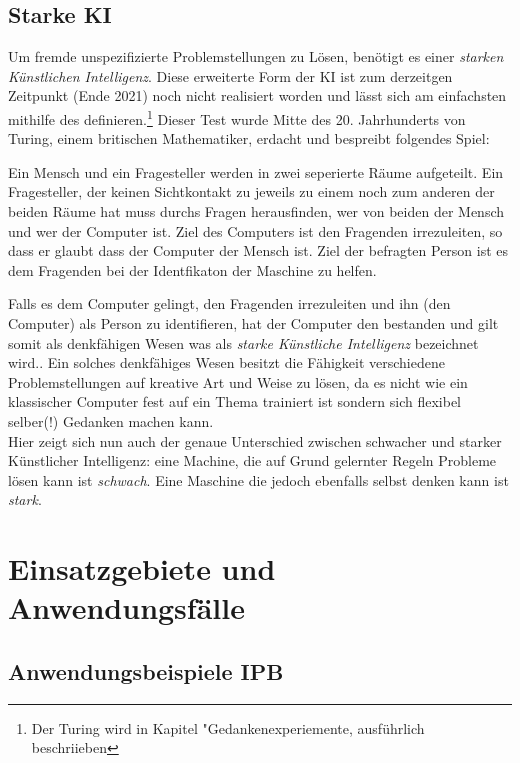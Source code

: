 \documentclass[12pt,german,ngerman]{report}
\begin{document}
    \section{Starke KI}
    Um fremde unspezifizierte Problemstellungen zu Lösen, benötigt es einer \emph{starken Künstlichen Intelligenz}.
    Diese erweiterte Form der KI ist zum derzeitgen Zeitpunkt (Ende 2021) noch nicht realisiert worden und lässt sich am
    einfachsten mithilfe des  definieren.\footnote{Der Turing wird in Kapitel "Gedankenexperiemente, ausführlich beschriieben}
    Dieser Test wurde Mitte des 20. Jahrhunderts von Turing, einem britischen Mathematiker, erdacht und bespreibt folgendes Spiel:
    \begin{displayquote}
        Ein Mensch und ein Fragesteller werden in zwei seperierte
        Räume aufgeteilt. Ein Fragesteller, der keinen Sichtkontakt zu jeweils zu einem noch zum anderen der beiden Räume hat
        muss durchs Fragen herausfinden, wer von beiden der Mensch und wer der Computer ist.
        Ziel des Computers ist den Fragenden irrezuleiten, so dass er glaubt dass der Computer der Mensch ist.
        Ziel der befragten Person ist es dem Fragenden bei der Identfikaton der Maschine zu helfen.\autocite{turing1950computing}
    \end{displayquote}
    Falls es dem Computer gelingt, den Fragenden irrezuleiten und ihn (den Computer) als Person zu identifieren, hat der Computer
    den  bestanden und gilt somit als denkfähigen Wesen was als \emph{starke Künstliche Intelligenz}
    bezeichnet wird.\autocite{oppy&dowe2020turingtest}. Ein solches denkfähiges Wesen besitzt die Fähigkeit verschiedene Problemstellungen
    auf kreative Art und Weise zu lösen, da es nicht wie ein klassischer Computer fest auf ein Thema trainiert ist sondern
    sich flexibel selber(!) Gedanken machen kann.\\

    Hier zeigt sich nun auch der genaue Unterschied zwischen schwacher und starker Künstlicher Intelligenz: eine Machine,
    die auf Grund gelernter Regeln Probleme lösen kann ist \emph{schwach}. Eine Maschine die jedoch ebenfalls selbst denken
    kann ist \emph{stark}.


    \chapter{Einsatzgebiete und Anwendungsfälle}
    \section{Anwendungsbeispiele IPB}
\end{document}

